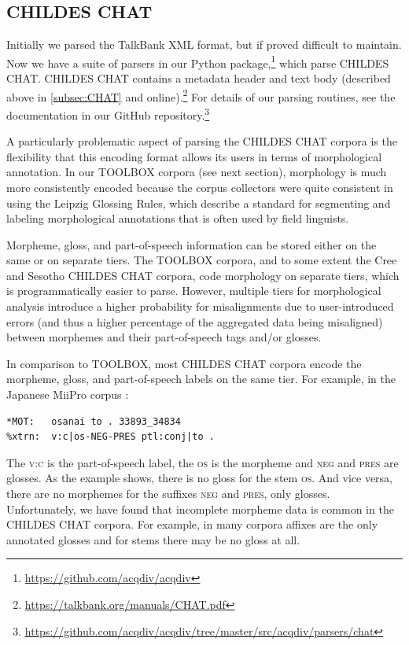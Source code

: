 \documentclass[a4paper, 11pt]{book}
\begin{document}
\subsection{CHILDES CHAT}

Initially we parsed the TalkBank XML format, but if proved difficult to maintain. Now we have a suite of parsers in our Python package,\footnote{\url{https://github.com/acqdiv/acqdiv}} which parse CHILDES CHAT. CHILDES CHAT contains a metadata header and text body (described above in \autoref{subsec:CHAT} and online).\footnote{\url{https://talkbank.org/manuals/CHAT.pdf}} For details of our parsing routines, see the documentation in our GitHub repository.\footnote{\url{https://github.com/acqdiv/acqdiv/tree/master/src/acqdiv/parsers/chat}}

A particularly problematic aspect of parsing the CHILDES CHAT corpora is the flexibility that this encoding format allows its users in terms of morphological annotation. In our TOOLBOX corpora (see next section), morphology is much more consistently encoded because the corpus collectors were quite consistent in using the Leipzig Glossing Rules, which describe a standard for segmenting and labeling morphological annotations that is often used by field linguists.

Morpheme, gloss, and part-of-speech information can be stored either on the same or on separate tiers. The TOOLBOX corpora, and to some extent the Cree and Sesotho CHILDES CHAT corpora, code morphology on separate tiers, which is programmatically easier to parse. However, multiple tiers for morphological analysis introduce a higher probability for misalignments due to user-introduced errors (and thus a higher percentage of the aggregated data being misaligned) between morphemes and their part-of-speech tags and/or glosses.

In comparison to TOOLBOX, most CHILDES CHAT corpora encode the morpheme, gloss, and part-of-speech labels on the same tier. For example, in the Japanese MiiPro corpus \citep{Miyata_etal2009a,Miyata_etal2010a,Nisisawa_etal2009a,Nisisawa_etal2010a}:

\begin{verbatim}
*MOT:	osanai to . 33893_34834
%xtrn:	v:c|os-NEG-PRES ptl:conj|to .
\end{verbatim}

The \textsc{v:c} is the part-of-speech label, the \textsc{os} is the morpheme and \textsc{neg} and \textsc{pres} are glosses. As the example shows, there is no gloss for the stem \textsc{os}. And vice versa, there are no morphemes for the suffixes \textsc{neg} and \textsc{pres}, only glosses. Unfortunately, we have found that incomplete morpheme data is common in the CHILDES CHAT corpora. For example, in many corpora affixes are the only annotated glosses and for stems there may be no gloss at all.
\end{document}
